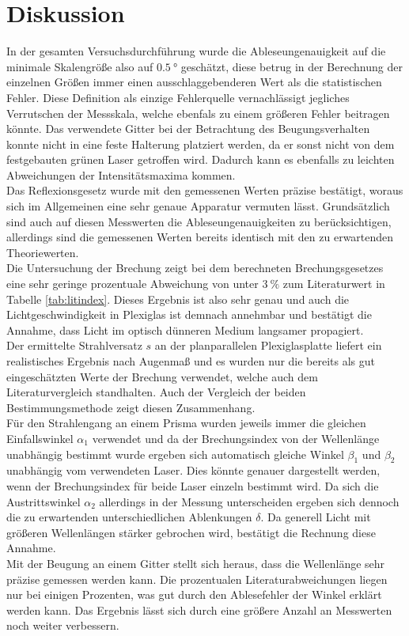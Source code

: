 \section{Diskussion}

In der gesamten Versuchsdurchführung wurde die Ableseungenauigkeit auf die minimale Skalengröße also auf $\SI{0.5}{\degree}$ geschätzt, diese betrug in der
Berechnung der einzelnen Größen immer einen ausschlaggebenderen Wert als die statistischen Fehler. Diese Definition als einzige Fehlerquelle vernachlässigt jegliches Verrutschen der Messskala, welche ebenfals zu einem
größeren Fehler beitragen könnte. Das verwendete Gitter bei der Betrachtung des Beugungsverhalten konnte nicht in eine feste Halterung platziert werden, da er sonst nicht von dem festgebauten grünen Laser getroffen wird. Dadurch
kann es ebenfalls zu leichten Abweichungen der Intensitätsmaxima kommen.
\newline
\\
Das Reflexionsgesetz wurde mit den gemessenen Werten präzise bestätigt, woraus sich im Allgemeinen eine sehr genaue Apparatur vermuten lässt. Grundsätzlich sind auch auf diesen Messwerten die Ableseungenauigkeiten zu berücksichtigen, allerdings
sind die gemessenen Werten bereits identisch mit den zu erwartenden Theoriewerten.
\newline
\\
Die Untersuchung der Brechung zeigt bei dem berechneten Brechungsgesetzes eine sehr geringe prozentuale Abweichung von unter $\SI{3}{\percent}$ zum Literaturwert in Tabelle \ref{tab:litindex}. Dieses Ergebnis ist also sehr genau und auch
die Lichtgeschwindigkeit in Plexiglas ist demnach annehmbar und bestätigt die Annahme, dass Licht im optisch dünneren Medium langsamer propagiert.
\newline
\\
Der ermittelte Strahlversatz $s$ an der planparallelen Plexiglasplatte liefert ein realistisches Ergebnis nach Augenmaß und es wurden nur die bereits als gut eingeschätzten Werte der Brechung verwendet, welche auch dem
Literaturvergleich standhalten. Auch der Vergleich der beiden Bestimmungsmethode zeigt diesen Zusammenhang.
\newline
\\
Für den Strahlengang an einem Prisma wurden jeweils immer die gleichen Einfallswinkel $\alpha_1$ verwendet und da der Brechungsindex von der Wellenlänge unabhängig bestimmt wurde ergeben sich automatisch gleiche Winkel $\beta_1$ und $\beta_2$ 
unabhängig vom verwendeten Laser. Dies könnte genauer dargestellt werden, wenn der Brechungsindex für beide Laser einzeln bestimmt wird. Da sich die Austrittswinkel $\alpha_2$ allerdings in der Messung unterscheiden ergeben sich dennoch die zu 
erwartenden unterschiedlichen Ablenkungen $\delta$. Da generell Licht mit größeren Wellenlängen stärker gebrochen wird, bestätigt die Rechnung diese Annahme.
\newline
\\
Mit der Beugung an einem Gitter stellt sich heraus, dass die Wellenlänge sehr präzise gemessen werden kann.
Die prozentualen Literaturabweichungen liegen nur bei einigen Prozenten, was gut durch den Ablesefehler der Winkel erklärt werden kann. Das Ergebnis lässt sich durch eine größere Anzahl an Messwerten noch weiter verbessern.